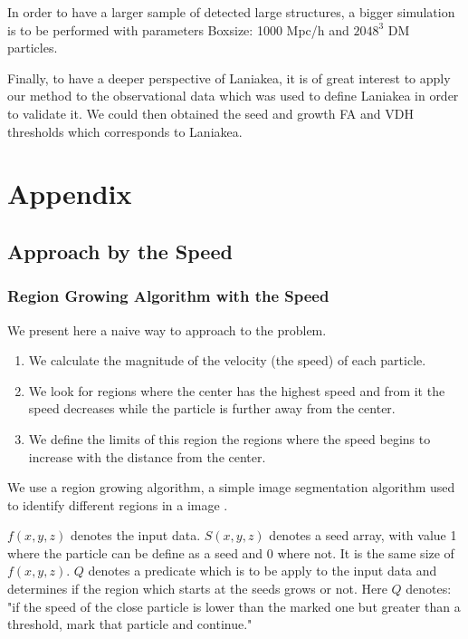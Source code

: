 \documentclass[12pt]{article}
\begin{document}
\begin{par}
In order to have a larger sample of detected large
 structures, a bigger simulation is to be performed
  with parameters Boxsize: 1000 Mpc/h and $2048^3$
   DM particles. \\
\end{par}

\begin{par}
Finally, to have a deeper perspective of Laniakea, it is
 of great interest to apply our method to the observational
  data which was used to define Laniakea in order to validate
   it. We could then obtained
   the seed and growth FA and VDH thresholds which
    corresponds to Laniakea.
\end{par}





\appendix
\section{Appendix}
\subsection{Approach by the Speed} 
\label{App:App_Speed}
\subsubsection{Region Growing Algorithm with the Speed}

We present here a naive way to approach to the problem. 
\begin{enumerate}
	\item We calculate the magnitude of the velocity (the speed) of each particle. 
	\item We look for regions where the center has the highest speed and from it the speed decreases while the particle is further away from the center. 
    \item We define the limits of this region the regions where the speed begins to increase with the distance from the center.
\end{enumerate}

\begin{par}
We use a region growing algorithm, a simple image segmentation algorithm
used to identify different regions in a image \cite{gonzalez_digital_2008}.
\end{par}

\begin{par}
$f(x,y,z)$ denotes the input data. $S(x,y,z)$ denotes a seed array, with
value 1 where the particle can be define as a seed and 0 where not. It is the
same size of $f(x,y,z)$. $Q$ denotes a predicate which is to be apply to the
input data and determines if the region which
 starts at the seeds grows or
not. Here $Q$ denotes: "if the speed of the close
 particle is lower than the
marked one but greater than a threshold, mark that
 particle and continue."
\end{par}
\end{document}
